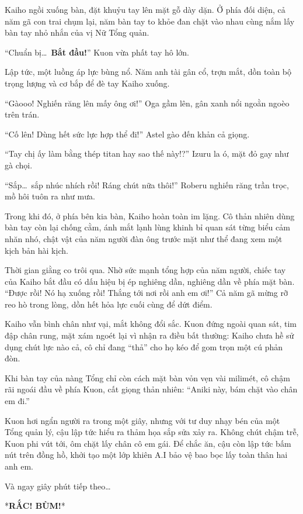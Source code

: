 \documentclass[../main.tex]{subfiles}
\begin{document}
\ct

Kaiho ngồi xuống bàn, đặt khuỷu tay lên mặt gỗ dày dặn. Ở phía đối diện, cả năm gã con trai chụm lại, năm bàn tay to khỏe đan chặt vào nhau cùng nắm lấy bàn tay nhỏ nhắn của vị Nữ Tổng quản.

``Chuẩn bị\dots\ \textbf{Bắt đầu!}'' Kuon vừa phất tay hô lớn.

Lập tức, một luồng áp lực bùng nổ. Năm anh tài gân cổ, trợn mắt, dồn toàn bộ trọng lượng và cơ bắp để đè tay Kaiho xuống.

``Gàooo! Nghiến răng lên mấy ông ơi!'' Oga gầm lên, gân xanh nổi ngoằn ngoèo trên trán.

``Cố lên! Dùng hết sức lực hợp thể đi!'' Astel gào đến khản cả giọng.

``Tay chị ấy làm bằng thép titan hay sao thế này!?'' Izuru la ó, mặt đỏ gay như gà chọi.

``Sắp\dots\ sắp nhúc nhích rồi! Ráng chút nữa thôi!'' Roberu nghiến răng trần trọc, mồ hôi tuôn ra như mưa.

Trong khi đó, ở phía bên kia bàn, Kaiho hoàn toàn im lặng. Cô thản nhiên dùng bàn tay còn lại chống cằm, ánh mắt lạnh lùng khinh bỉ quan sát từng biểu cảm nhăn nhó, chật vật của năm người đàn ông trước mặt như thể đang xem một kịch bản hài kịch.

Thời gian giằng co trôi qua. Nhờ sức mạnh tổng hợp của năm người, chiếc tay của Kaiho bắt đầu có dấu hiệu bị ép nghiêng dần, nghiêng dần về phía mặt bàn. ``Được rồi! Nó hạ xuống rồi! Thắng tới nơi rồi anh em ơi!'' Cả năm gã mừng rỡ reo hò trong lòng, dồn hết hỏa lực cuối cùng để dứt điểm.

Kaiho vẫn bình chân như vại, mắt không đổi sắc. Kuon đứng ngoài quan sát, tim đập chân rung, mặt xám ngoét lại vì nhận ra điều bất thường: Kaiho chưa hề sử dụng chút lực nào cả, cô chỉ đang ``thả'' cho họ kéo để gom trọn một cú phản đòn.

Khi bàn tay của nàng Tổng chỉ còn cách mặt bàn vỏn vẹn vài milimét, cô chậm rãi ngoái đầu về phía Kuon, cất giọng thản nhiên: ``Aniki này, bám chặt vào chân em đi.''

Kuon hơi ngẩn người ra trong một giây, nhưng với tư duy nhạy bén của một Tổng quản lý, cậu lập tức hiểu ra thảm họa sắp sửa xảy ra. Không chút chậm trễ, Kuon phi vút tới, ôm chặt lấy chân cô em gái. Để chắc ăn, cậu còn lập tức bấm nút trên đồng hồ, khởi tạo một lớp khiên A.I bảo vệ bao bọc lấy toàn thân hai anh em.

Và ngay giây phút tiếp theo\dots

*\textbf{RẮC! BÙM!}*
\end{document}

